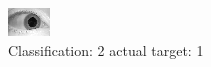 \begin{figure}[h!]
\begin{center}
\includegraphics[width=0.60\columnwidth]{figures/ID1588_class_2_target_1.png}
\end{center}
\caption{ Classification: 2 actual target: 1}
\label{fig:ID1588_class_2_target_1}
\end{figure}
